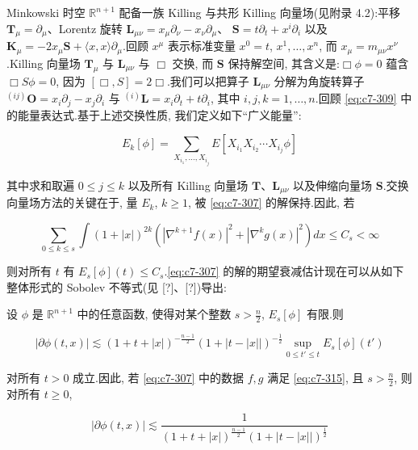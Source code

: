 Minkowski 时空 $\mathbb{R}^{n+1}$ 配备一族 Killing 与共形 Killing 向量场(见附录 4.2):平移 $\mathbf{T}_{\mu} = \partial_{\mu}$、Lorentz 旋转 $\mathbf{L}_{\mu\nu} = x_{\mu}\partial_{\nu} - x_{\nu}\partial_{\mu}$、 $\mathbf{S} = t\partial_t + x^i\partial_i$ 以及 $\mathbf{K}_{\mu} = -2x_{\mu}\mathbf{S} + \langle x, x\rangle\partial_{\mu}$.回顾 $x^{\mu}$ 表示标准变量 $x^0 = t$, $x^1, \ldots, x^n$, 而 $x_{\mu} = m_{\mu\nu}x^{\nu}$.Killing 向量场 $\mathbf{T}_{\mu}$ 与 $\mathbf{L}_{\mu\nu}$ 与 $\Box$ 交换, 而 $\mathbf{S}$ 保持解空间, 其含义是:$\Box\phi = 0$ 蕴含 $\Box S\phi = 0$, 因为 $[\Box, S] = 2\Box$.我们可以把算子 $\mathbf{L}_{\mu\nu}$ 分解为角旋转算子 $^{(ij)}\mathbf{O} = x_i\partial_j - x_j\partial_i$ 与 $^{(i)}\mathbf{L} = x_i\partial_t + t\partial_i$, 其中 $i, j, k = 1, \ldots, n$.回顾 \eqref{eq:c7-309} 中的能量表达式.基于上述交换性质, 我们定义如下``广义能量'':

\begin{equation}
E_k[\phi] = \sum_{X_{i_1}, \ldots, X_{i_j}}E[X_{i_1}X_{i_2}\cdots X_{i_j}\phi]\label{eq:c7-314}
\end{equation}

其中求和取遍 $0\leq j\leq k$ 以及所有 Killing 向量场 $\mathbf{T}$、$\mathbf{L}_{\mu\nu}$ 以及伸缩向量场 $\mathbf{S}$.交换向量场方法的关键在于, 量 $E_k$, $k\geq 1$, 被 \eqref{eq:c7-307} 的解保持.因此, 若

\begin{equation}
\sum_{0\leq k\leq s}\int(1+|x|)^{2k}\left(|\nabla^{k+1}f(x)|^2 + |\nabla^k g(x)|^2\right)dx \leq C_s < \infty\label{eq:c7-315}
\end{equation}

则对所有 $t$ 有 $E_s[\phi](t)\leq C_s$.\eqref{eq:c7-307} 的解的期望衰减估计现在可以从如下整体形式的 Sobolev 不等式(见 [?]、[?])导出:

\begin{theorem}[全局 Sobolev 估计]\label{thm:c7-0.26}
设 $\phi$ 是 $\mathbb{R}^{n+1}$ 中的任意函数, 使得对某个整数 $s > \frac{n}{2}$, $E_s[\phi]$ 有限.则

\begin{equation}
|\partial\phi(t, x)| \lesssim (1+t+|x|)^{-\frac{n-1}{2}}(1+|t-|x||)^{-\frac{1}{2}}\sup_{0\leq t'\leq t}E_s[\phi](t')\label{eq:c7-316}
\end{equation}

对所有 $t>0$ 成立.因此, 若 \eqref{eq:c7-307} 中的数据 $f, g$ 满足 \eqref{eq:c7-315}, 且 $s > \frac{n}{2}$, 则对所有 $t\geq 0$,

\begin{equation}
|\partial\phi(t, x)| \lesssim \frac{1}{(1+t+|x|)^{\frac{n-1}{2}}(1+|t-|x||)^{\frac{1}{2}}}\label{eq:c7-317}
\end{equation}
\end{theorem}


